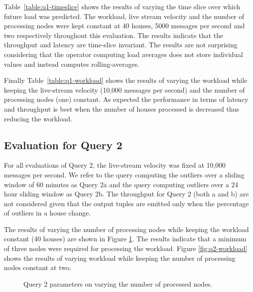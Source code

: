 \documentclass{sig-alternate}
\begin{document}
  Table~\ref{table:q1-timeslice} shows the results of varying the time slice over which future load was predicted. The workload, live stream velocity and the number of processing nodes were kept constant at 40 houses, 5000 messages per second and two respectively throughout this evaluation. The results indicate that the throughput and latency are time-slice invariant. The results are not surprising considering that the operator computing load averages does not store individual values and instead computes rolling-averages. 
  
  Finally  Table~\ref{table:q1-workload} shows the results of varying the workload while keeping the live-stream velocity (10,000 messages per second) and the number of processing nodes (one) constant. As expected the performance in terms of latency and throughput is best when the number of houses processed is decreased thus reducing the workload.


\subsection{Evaluation for Query 2}
\label{sub:eval-query 2}

For all evaluations of Query 2, the live-stream velocity was fixed at 10,000 messages per second. We refer to the query computing the outliers over a sliding window of 60 minutes as Query 2a and the  query computing outliers over a  24 hour sliding window as Query 2b. The throughput for Query 2 (both a and b) are not considered given that the output tuples are emitted only when the percentage of outliers in a house change.

The results of varying the number of processing nodes while keeping the workload constant (40 houses) are shown in Figure \ref{fig:q2-nodes}. The results indicate that a minimum of three  nodes were required for processing the workload. Figure \ref{fig:q2-workload} shows the results of varying workload while keeping the number of processing nodes constant at two.

\begin{figure}[!htbp]
\caption{Query 2 parameters on varying the number of processed nodes.} \label{fig:q2-nodes} 
\end{figure}
\end{document}
